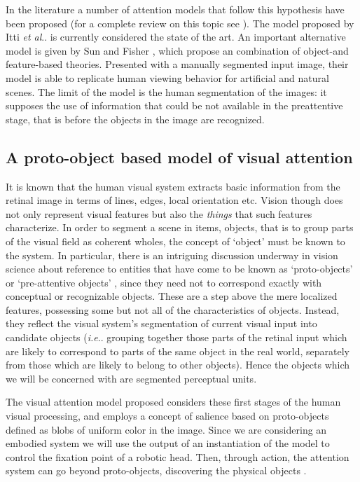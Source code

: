 \documentclass{llncs}
\makeatletter
\DeclareRobustCommand\onedot{\futurelet\@let@token\@onedot}
\def\@onedot{\ifx\@let@token.\else.\null\fi\xspace}
\def\ie{\emph{i.e}\onedot} \def\Ie{\emph{I.e}\onedot}
\def\etal{\emph{et al}\onedot}
\makeatother
\begin{document}
In the literature a number of attention models that
follow this hypothesis have been proposed \cite{MilaneseGP95,IttiKN98}
(for a complete review on this topic see \cite{IttiK01}).
The model proposed by Itti \etal \cite{IttiKN98} is currently considered
the state of the art.
An important alternative model is
given by Sun and Fisher \cite{SunF03}, which propose an
combination of object-and feature-based theories. Presented
with a manually segmented input image, their model is able to
replicate human viewing behavior for artificial and natural
scenes. The limit of the model is the human segmentation of the images:
it supposes the use of information that could
be not available in the preattentive stage, that is before
the objects in the image are recognized.


\subsection{A proto-object based model of visual attention}

It is known that the human visual
system extracts basic information from the retinal
image in terms of lines, edges, local orientation etc.
Vision though does not only represent visual features
but also the \emph{things} that such features characterize. In
order to segment a scene in items, objects, that is to
group parts of the visual field as coherent wholes, the
concept of `object' must be known to the system.
In particular, there is an intriguing discussion underway
in vision science about reference to entities that have
come to be known as `proto-objects' or `pre-attentive
objects' \cite{RensinkORC97,Rensink00a,Pylyshyn01}, since they need not to correspond
exactly with conceptual or recognizable objects.
These are a step above the mere localized
features, possessing some but not all of the
characteristics of objects.
Instead, they reflect the visual
system's segmentation of current visual input into candidate objects (\ie grouping
together those parts of the retinal input which are likely to correspond to parts of the
same object in the real world, separately from those which are likely to belong to
other objects).
Hence the objects which we will be concerned with are segmented perceptual units.

The visual attention model proposed considers
these first stages of the human visual processing, and
employs a concept of salience based on proto-objects
defined as blobs of uniform color in the
image. Since we are considering an embodied system
we will use the output of an instantiation of the model
to control the fixation point of a robotic head.
Then, through action, the attention system can go
beyond proto-objects, discovering the physical objects \cite{MettaF03,Orabona07}.
\end{document}
